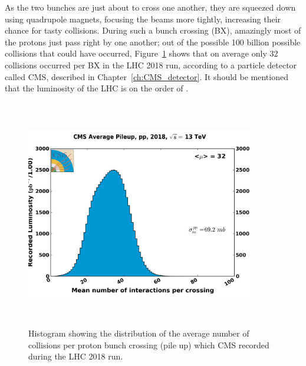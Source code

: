 As the two bunches are just about to cross one another, they are squeezed down using quadrupole magnets, focusing the beams more tightly, increasing their chance for tasty \pp collisions.
During such a bunch crossing (BX), amazingly most of the protons just pass right by one another; 
out of the possible 100 billion possible collisions that could have occurred, Figure~\ref{plt:pileup} shows that on average only 32 collisions occurred per BX in the LHC 2018 run, according to a particle detector called CMS, described in Chapter~\ref{ch:CMS_detector}.
It should be mentioned that the luminosity of the LHC is on the order of \LHigh. %
\begin{figure}[pbth]
\centering
\includegraphics[width=10cm,height=10cm,keepaspectratio]{figures/lhc/pileup_pp_2018.png}
    \caption{Histogram showing the distribution of the average number of \pp collisions per proton bunch crossing (pile up) which CMS recorded during the LHC 2018 run.} 
    \label{plt:pileup}
\end{figure}

